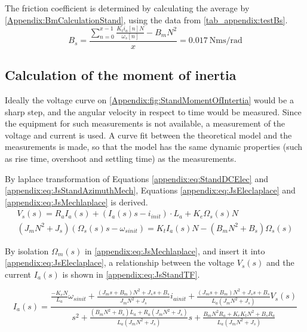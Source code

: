 The friction coefficient is determined by calculating the average by \autoref{Appendix:BmCalculationStand}, using the data from \autoref{tab_appendix:testBs}.
\begin{equation}
B_s = \frac{\sum\limits_{n=0}^{x-1} \frac{K_t i_{a}[n] N}{\omega_{s}[n]}-B_m N^2}{x}=\SI{0.017}{\newton\metre\second\per\radian}\label{Appendix:BmCalculationStand}
\end{equation}
\startexplain
{}
\stopexplain
\subsection*{Calculation of the moment of inertia}
Ideally the voltage curve on \autoref{Appendix:fig:StandMomentOfIntertia} would be a sharp step, and the angular velocity in respect to time would be measured. Since the equipment for such measurements is not available, a measurement of the voltage and current is used. A curve fit between the theoretical model and the measurements is made, so that the model has the same dynamic properties (such as rise time, overshoot and settling time) as the measurements.

By laplace transformation of Equations \ref{appendix:eq:StandDCElec} and \ref{appendix:eq:JsStandAzimuthMech}, Equations \ref{appendix:eq:JsEleclaplace} and \ref{appendix:eq:JsMechlaplace} is derived.
\begin{subequations}
\begin{align} \label{appendix:eq:JsEleclaplace}
V_{s}(s) = R_{a} I_a(s) + \left(I_a(s)  s-i_{init} \right) \cdot L_a + K_{e}\Omega_{s}(s) N      \\
\left(J_m N^2 + J_s\right) \left(\Omega_{s}(s) s - \omega_{sinit}\right) = K_t I_a(s) N - \left(B_m N^2 + B_s \right)\Omega_s(s) \label{appendix:eq:JsMechlaplace}
\end{align}
\end{subequations}

By isolation $\Omega_m(s)$ in \autoref{appendix:eq:JsMechlaplace}, and insert it into \autoref{appendix:eq:JsEleclaplace}, a relationship between the voltage $V_s(s)$ and the current $I_a(s)$ is shown in \autoref{appendix:eq:JsStandTF}.

\begin{equation} \label{appendix:eq:JsStandTF}
I_a(s) =  \frac{ \frac{-K_e N}{L_a}\omega_{sinit}+\frac{(J_m s + B_m) N^2 + J_s s + B_s}{J_m N^2 + J_s} i_{ainit} + \frac{(J_m s + B_m) N^2 + J_s s + B_s}{L_a (J_m N^2 + J_s)} V_s(s)   }{  s^2 + \frac{(B_m N^2 + B_s) L_a + R_a (J_m N^2 + J_s)}{L_a (J_m N^2 + J_s)} s + \frac{B_m N^2 R_a + K_e K_t N^2 + B_s R_a}{L_a (J_m N^2 + J_s)}  } 
\end{equation}

